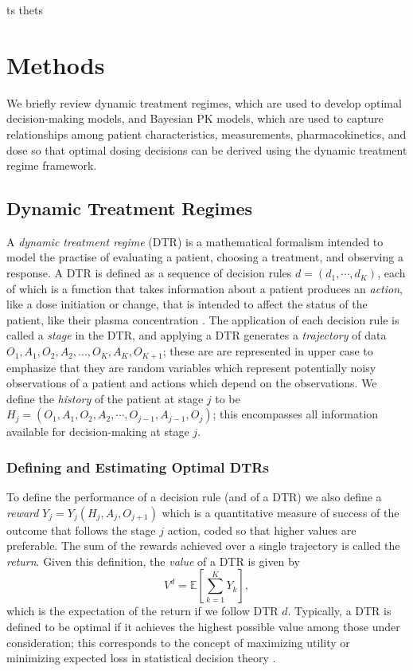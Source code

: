 ts thets\section{Methods}\label{ss:background}

We briefly review dynamic treatment regimes, which are used to develop optimal decision-making models, and Bayesian PK models, which are used to capture relationships among patient characteristics, measurements, pharmacokinetics, and dose so that optimal dosing decisions can be derived using the dynamic treatment regime framework.

\subsection{Dynamic Treatment Regimes}

A \textit{dynamic treatment regime} (DTR) is a mathematical formalism intended to model the practise of evaluating a patient, choosing a treatment, and observing a response. A DTR is defined as a sequence of decision rules $d = (d_1, \cdots, d_K)$, each of which is a function that takes information about a patient produces an \textit{action}, like a dose initiation or change, that is intended to affect the status of the patient, like their plasma concentration \cite{chakraborty2013statistical,lizotte17reinforcement,tsiatis2019dynamic}. The application of each decision rule is called a \textit{stage} in the DTR, and applying a DTR generates a \textit{trajectory} of data $O_1, A_1, O_2, A_2, ..., O_K, A_K, O_{K+1}$; these are are represented in upper case to emphasize that they are random variables which represent potentially noisy observations of a patient and actions which depend on the observations. We define the \textit{history} of the patient at stage $j$ to be $ H_j = (O_1, A_1, O_2, A_2, \cdots , O_{j-1}, A_{j-1}, O_j)$; this encompasses all information available for decision-making at stage $j$. 

\subsubsection{Defining and Estimating Optimal DTRs}

To define the performance of a decision rule (and of a DTR) we also define a \textit{reward} $ Y_j = Y_j(H_j, A_j, O_{j+1})$ which is a quantitative measure of success of the outcome that follows the stage $j$ action, coded so that higher values are preferable. The sum of the rewards achieved over a single trajectory is called the \textit{return}.  Given this definition, the \textit{value} of a DTR is given by
\begin{equation}
	V^d = \mathbb{E}\left[ \sum_{k=1}^K Y_k \right],
\end{equation}
which is the expectation of the return if we follow DTR $d$. Typically, a DTR is defined to be optimal if it achieves the highest possible value among those under consideration; this corresponds to the concept of maximizing utility or minimizing expected loss in statistical decision theory \cite{berger2013statistical}.

